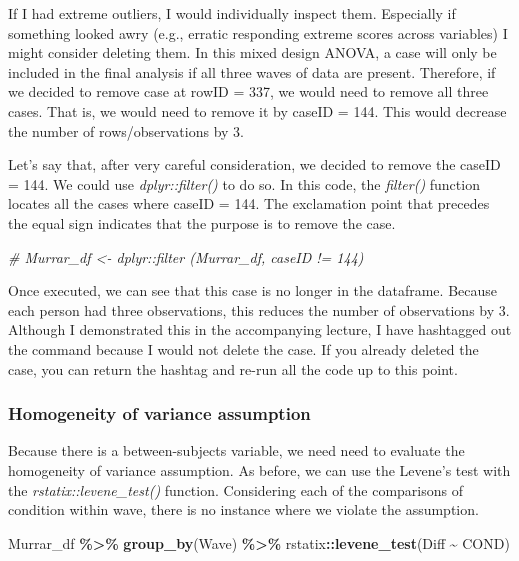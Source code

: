 \documentclass[
  11pt,
]{book}
\newenvironment{Shaded}{\begin{snugshade}}{\end{snugshade}}
\newcommand{\CommentTok}[1]{\textcolor[rgb]{0.37,0.37,0.37}{\textit{#1}}}
\newcommand{\FunctionTok}[1]{\textcolor[rgb]{0.27,0.27,0.27}{\textbf{#1}}}
\newcommand{\NormalTok}[1]{#1}
\newcommand{\SpecialCharTok}[1]{\textcolor[rgb]{0.43,0.43,0.43}{\textbf{#1}}}
\begin{document}
If I had extreme outliers, I would individually inspect them. Especially if something looked awry (e.g., erratic responding extreme scores across variables) I might consider deleting them. In this mixed design ANOVA, a case will only be included in the final analysis if all three waves of data are present. Therefore, if we decided to remove case at rowID = 337, we would need to remove all three cases. That is, we would need to remove it by caseID = 144. This would decrease the number of rows/observations by 3.

Let's say that, after very careful consideration, we decided to remove the caseID = 144. We could use \emph{dplyr::filter()} to do so. In this code, the \emph{filter()} function locates all the cases where caseID = 144. The exclamation point that precedes the equal sign indicates that the purpose is to remove the case.

\begin{Shaded}
\begin{Highlighting}[]
\CommentTok{\# Murrar\_df \textless{}{-} dplyr::filter (Murrar\_df, caseID != \textquotesingle{}144\textquotesingle{})}
\end{Highlighting}
\end{Shaded}

Once executed, we can see that this case is no longer in the dataframe. Because each person had three observations, this reduces the number of observations by 3. Although I demonstrated this in the accompanying lecture, I have hashtagged out the command because I would not delete the case. If you already deleted the case, you can return the hashtag and re-run all the code up to this point.

\hypertarget{homogeneity-of-variance-assumption}{%
\subsubsection{Homogeneity of variance assumption}\label{homogeneity-of-variance-assumption}}

Because there is a between-subjects variable, we need need to evaluate the homogeneity of variance assumption. As before, we can use the Levene's test with the \emph{rstatix::levene\_test()} function. Considering each of the comparisons of condition within wave, there is no instance where we violate the assumption.

\begin{Shaded}
\begin{Highlighting}[]
\NormalTok{Murrar\_df }\SpecialCharTok{\%\textgreater{}\%}
    \FunctionTok{group\_by}\NormalTok{(Wave) }\SpecialCharTok{\%\textgreater{}\%}
\NormalTok{    rstatix}\SpecialCharTok{::}\FunctionTok{levene\_test}\NormalTok{(Diff }\SpecialCharTok{\textasciitilde{}}\NormalTok{ COND)}
\end{Highlighting}
\end{Shaded}
\end{document}
